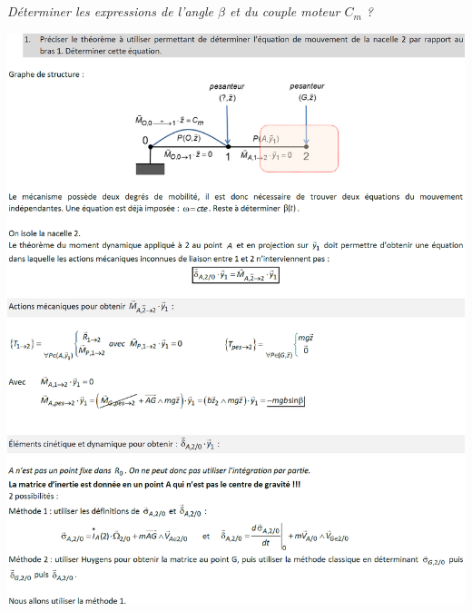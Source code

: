 \documentclass[10pt,fleqn]{article} %
\begin{document}
\begin{multicols}{2}
\subparagraph{}
\textit{Déterminer les expressions de l’angle $\beta$ et du couple moteur $C_m$ ?}
\ifprof
\begin{corrige}
\end{corrige}
\else
\fi



\end{multicols}
\newpage

\begin{center}
\includegraphics[width=\linewidth]{images/cor_01}
\end{center}
\end{document}
